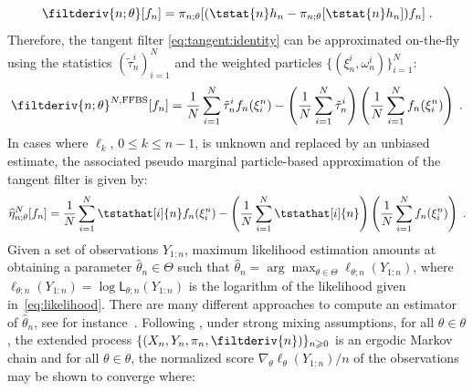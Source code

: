 \documentclass{article}
\newcommand{\logllh}[1]{\ell_{#1}}
\newcommand{\llh}[1]{\mathsf{L}_{#1}}
\newcommand{\pred}[1]{\pi_{#1}}
\newcommand{\parvec}{\theta}
\newcommand{\parspace}{\Theta}
\newcommand{\af}[1]{h_{#1}}
\newcommand{\deriv}{\nabla_{\parvec}}
\newcommand{\N}{N}
\newcommand{\tstattil}[2]{\tilde{\tau}_{#2}^{#1}}
\newcommand{\eqsp}{\;}
\newcommand{\ewght}[2]{\ensuremath{\omega_{#1}^{#2}}}
\newcommand{\epart}[2]{\ensuremath{\xi_{#1}^{#2}}}
\newcommand{\qg}[1]{\ell_{#1}}
\begin{document}
\begin{equation} 
\label{eq:tangent:identity}
\filtderiv{n;\parvec}[f_n] = \pred{n;\parvec}[(\tstat{n} \af{n} - \pred{n;\parvec}[\tstat{n} \af{n}]) f_n]\eqsp.
\end{equation}
Therefore, the tangent filter \eqref{eq:tangent:identity} can be approximated on-the-fly using the statistics $(\tstattil{i}{n})_{i=1}^{\N}$ and the weighted particles $\{(\epart{n}{i}, \ewght{n}{i})\}_{i=1}^{\N}$:
\begin{equation} 
\label{eq:tangent:identity:part}
\filtderiv{n;\parvec}^{N,\textrm{FFBS}}[f_n] = \frac{1}{\N}\sum_{i=1}^\N\tstattil{i}{n}f_n(\epart{i}{n}) - \left(\frac{1}{\N}\sum_{i=1}^\N\tstattil{i}{n}\right)\left(\frac{1}{\N}\sum_{i=1}^\N f_n(\epart{i}{n})\right)\eqsp.
\end{equation}
In cases where $\qg{k}$, $0\leqslant k \leqslant n-1$, is unknown and replaced by an unbiased estimate, the associated pseudo marginal particle-based approximation of the tangent filter is given by:
\begin{equation} 
\label{eq:tangent:identity:part:linear}
\widehat{\eta}_{n;\parvec}^{N}[f_n] = \frac{1}{\N}\sum_{i=1}^\N\tstathat[i]{n}f_n(\epart{i}{n}) - \left(\frac{1}{\N}\sum_{i=1}^\N\tstathat[i]{n}\right)\left(\frac{1}{\N}\sum_{i=1}^\N f_n(\epart{i}{n})\right)\eqsp.
\end{equation}
Given a set of observations $Y_{1:n}$, maximum likelihood estimation amounts at obtaining a parameter $\hat\parvec_{n} \in \parspace$ such that $\hat\parvec_{n} = \arg\max_{\parvec \in \parspace} \logllh{\parvec;n}(Y_{1:n})$, where $\logllh{\parvec;n}(Y_{1:n}) = \log \llh{\parvec;n}(Y_{1:n})$ is the logarithm of the likelihood given in~\eqref{eq:likelihood}. There are many different approaches to compute an estimator of $\hat\parvec_{n}$, see for instance~\cite[Chapter 10]{cappe:moulines:ryden:2005}. Following \cite{douc:matias:2001}, under strong mixing assumptions, for all  $\parvec \in \parvec$, the extended process $\{ (X_n, Y_n, \pred{n}, \filtderiv{n}) \}_{n \geqslant 0}$ is an ergodic Markov chain and for all $\parvec \in \parvec$, the normalized score $\deriv \logllh{\parvec}(Y_{1:n})/n$ of the observations may be shown to converge where:
\end{document}
